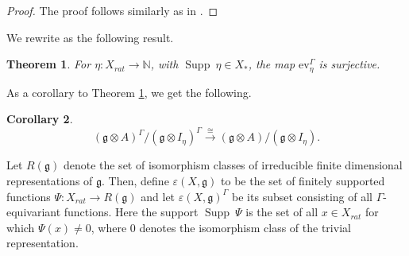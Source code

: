 \documentclass[11pt]{amsart}
\theoremstyle{plain}
\newtheorem{thm}{Theorem}[section]
\newtheorem{cor}[thm]{Corollary}
\theoremstyle{definition}
\newcommand{\g}{\mathfrak{g}}
\DeclareMathOperator{\Supp}{Supp}
\begin{document}
\begin{proof}
    The proof follows similarly as in \cite[Lemma 2.1]{FKKS12}.
\end{proof}
We rewrite \cite[Lemma 5.6]{Sav14} as the following result.
\begin{thm}\label{thm:9.7}
For $\eta:X_{rat}\rightarrow\mathbb{N}$, with $\Supp~\eta\in X_{*}$, the map $\mbox{ev}^{\Gamma}_{\eta}$ is surjective.
\end{thm}
As a corollary to Theorem \ref{thm:9.7}, we get the following.
\begin{cor}\label{cor:9.8}
    \begin{equation*}
        (\g\otimes A)^{\Gamma}/(\g\otimes I_{\eta})^{\Gamma}\xrightarrow{\cong}(\g\otimes A)/(\g\otimes I_{\eta}).
    \end{equation*}
\end{cor}
Let $R(\g)$ \label{pg:8} denote the set of isomorphism classes of irreducible finite dimensional representations of $\g$. Then, define $\varepsilon(X,\g)$ to be the set of finitely supported functions $\Psi: X_{rat}\rightarrow R(\g)$ and let $\varepsilon(X,\g)^{\Gamma}$ be its subset consisting of all $\Gamma$-equivariant functions. Here the support $\Supp\ \Psi$ is the set of all $x\in X_{rat}$ for which $\Psi(x)\neq 0$, where 0 denotes the isomorphism class of the trivial representation.
\end{document}
